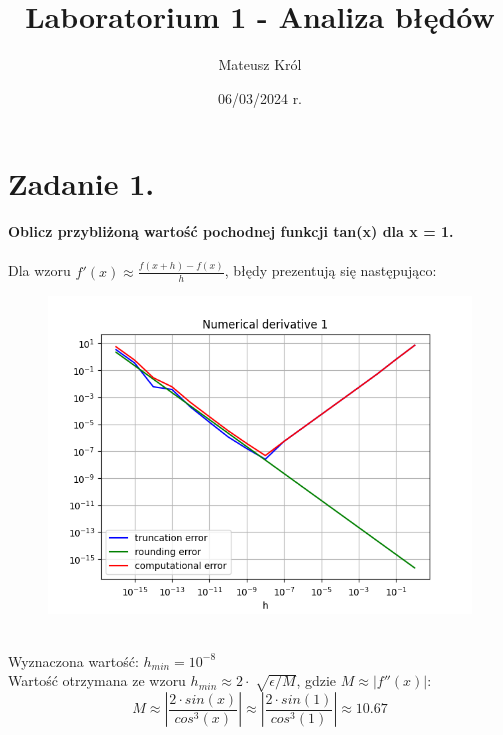 \documentclass{article}
\title{Laboratorium 1 - Analiza błędów}
\author{Mateusz Król}
\date{06/03/2024 r.}
\begin{document}
\maketitle


\section*{Zadanie 1.}
\textbf{Oblicz przybliżoną wartość pochodnej funkcji tan(x) dla x = 1.} 
\\\\
Dla wzoru $f'(x)\approx\frac{f(x+h)-f(x)}{h}$, błędy prezentują się następująco:
\begin{figure}[ht!]
\includegraphics[width=\linewidth]{figures/numerical_derivative_1.png}
\end{figure}
\\
Wyznaczona wartość: $h_{min} = 10^{-8}$ \\
Wartość otrzymana ze wzoru $h_{min} \approx 2\cdot\sqrt[]{\epsilon/M}$,
gdzie $M \approx \left|f''(x)\right|$: \\
$$M\approx \left|\frac{2 \cdot sin(x)}{cos^{3}(x)}\right|
\approx \left|\frac{2 \cdot sin(1)}{cos^{3}(1)}\right|
\approx 10.67$$
\end{document}
